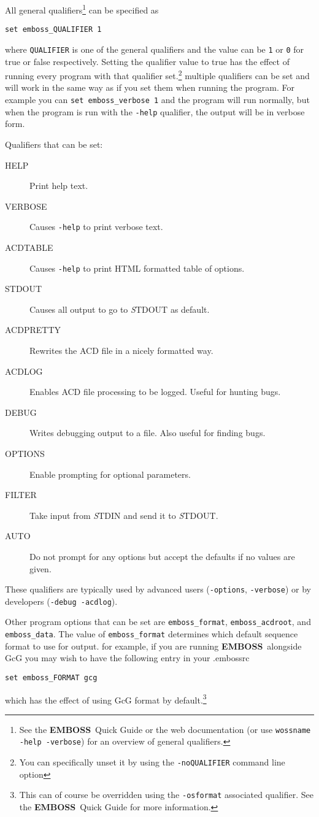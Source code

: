 \documentclass{report}
\newcommand{\ilcomm}[1]{{\tt #1}}
\newcommand{\filename}[1]{{\sf\textsl #1}}
\newcommand{\progname}[1]{{\sc #1}}
\newcommand{\EMBOSS}{{\sf\bfseries EMBOSS}}
\begin{document}
All general qualifiers\footnote{See the \EMBOSS\ Quick Guide or the web documentation (or use \ilcomm{wossname -help -verbose}) for an overview of general qualifiers.} can be specified as
\begin{verbatim}
set emboss_QUALIFIER 1
\end{verbatim} 
where \ilcomm{QUALIFIER} is one of the general qualifiers and the value can be \ilcomm{1} or \ilcomm{0} for true or false respectively. Setting the qualifier value to true has the effect of running every program with that qualifier set.\footnote{You can specifically unset it by using the \ilcomm{-noQUALIFIER} command line option} multiple qualifiers can be set and will work in the same way as if you set them when running the program. For example you can \ilcomm{set emboss\_verbose 1} and the program will run normally, but when the program is run with the \ilcomm{-help} qualifier, the output will be in verbose form.

Qualifiers that can be set:

\begin{description}
\item[HELP] Print help text.
\item[VERBOSE] Causes \ilcomm{-help} to print verbose text.
\item[ACDTABLE] Causes \ilcomm{-help} to print HTML formatted table of options.
\item[STDOUT] Causes all output to go to \filename{STDOUT} as default.
\item[ACDPRETTY] Rewrites the ACD file in a nicely formatted way.
\item[ACDLOG] Enables ACD file processing to be logged. Useful for hunting bugs.
\item[DEBUG] Writes debugging output to a file. Also useful for finding bugs.
\item[OPTIONS] Enable prompting for optional parameters.
\item[FILTER] Take input from \filename{STDIN} and send it to \filename{STDOUT}.
\item[AUTO] Do not prompt for any options but accept the defaults if no values are given.
\end{description}

These qualifiers are typically used by advanced users (\ilcomm{-options}, \ilcomm{-verbose}) or by developers (\ilcomm{-debug -acdlog}).


Other program options that can be set are \ilcomm{emboss\_format}, \ilcomm{emboss\_acdroot}, and \ilcomm{emboss\_data}. The value of \ilcomm{emboss\_format} determines which default sequence format to use for output. for example, if you are running \EMBOSS\ alongside \progname{GcG} you may wish to have the following entry in your \progname{.embossrc}
\begin{verbatim}
set emboss_FORMAT gcg
\end{verbatim}
which has the effect of using \progname{GcG} format by default.\footnote{This can of course be overridden using the \ilcomm{-osformat} associated qualifier. See the \EMBOSS\ Quick Guide for more information.}
\end{document}
